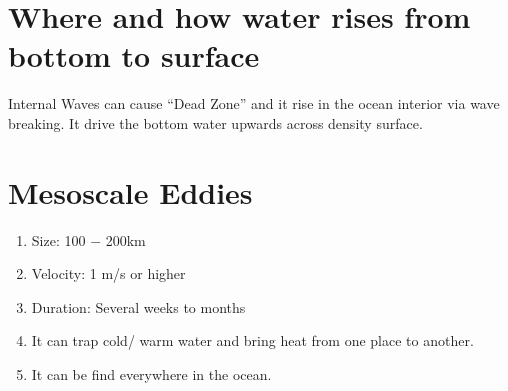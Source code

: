 \documentclass{report}
\begin{document}
\section{Where and how water rises from bottom to surface}
Internal Waves can cause ``Dead Zone'' and it rise in the ocean interior via wave breaking. It drive the bottom water upwards across density surface.


\section{Mesoscale Eddies}
\begin{enumerate}
    \item Size: 100 $-$ 200km
    \item Velocity: 1 m/s or higher
    \item Duration: Several weeks to months
    \item It can trap cold/ warm water and bring heat from one place to another.
    \item It can be find everywhere in the ocean.
\end{enumerate}
\end{document}
